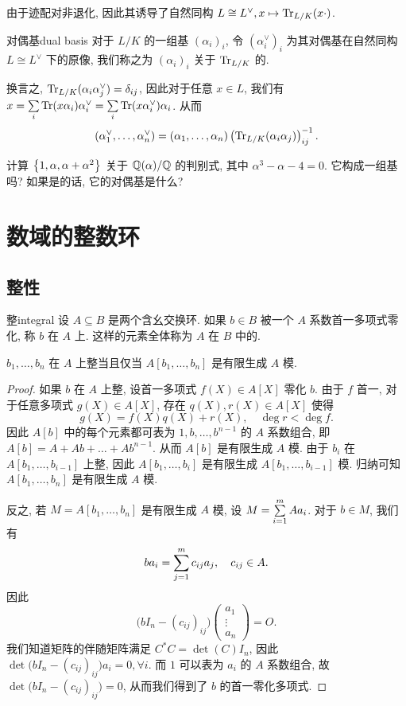 由于迹配对非退化, 因此其诱导了自然同构 $L\cong L^\vee, x\mapsto {\mathrm{Tr}}_{L/K}(x\cdot)$.
\begin{definition}{对偶基}{dual basis}
对于 $L/K$ 的一组基 $(\alpha_i)_i$, 令 $(\alpha_i^\vee)_i$ 为其对偶基在自然同构 $L\cong L^\vee$ 下的原像, 我们称之为 $(\alpha_i)_i$ 关于 ${\mathrm{Tr}}_{L/K}$ 的.
\end{definition}

换言之, ${\mathrm{Tr}}_{L/K}(\alpha_i\alpha_j^\vee)=\delta_{ij}$, 因此对于任意 $x\in L$, 我们有 $x=\sum\limits_i {\mathrm{Tr}}(x\alpha_i)\alpha_i^\vee=\sum\limits_i {\mathrm{Tr}}(x\alpha_i^\vee)\alpha_i$. 从而
  \[(\alpha_1^\vee,\dots,\alpha_n^\vee)=
    (\alpha_1,\dots,\alpha_n)\left({\mathrm{Tr}}_{L/K}(\alpha_i\alpha_j)\right)_{ij}^{-1}.\]

\begin{exercise}
计算 $\left\{1,\alpha,\alpha+\alpha^2\right\}$ 关于 ${\mathbb{Q}}(\alpha)/{\mathbb{Q}}$ 的判别式, 其中 $\alpha^3-\alpha-4=0$. 它构成一组基吗? 如果是的话, 它的对偶基是什么?
\end{exercise}



\section{数域的整数环}
\label{ring of intergers}

\subsection{整性}
\begin{definition}{整}{integral}
设 $A\subseteq B$ 是两个含幺交换环. 如果 $b\in B$ 被一个 $A$ 系数首一多项式零化, 称 $b$ 在 $A$ 上. 这样的元素全体称为 $A$ 在 $B$ 中的.
\end{definition}

\begin{proposition}{}{}
$b_1,\dots,b_n$ 在 $A$ 上整当且仅当 $A[b_1,\dots,b_n]$ 是有限生成 $A$ 模.
\end{proposition}
\begin{proof}
如果 $b$ 在 $A$ 上整, 设首一多项式 $f(X)\in A[X]$ 零化 $b$. 由于 $f$ 首一, 对于任意多项式 $g(X)\in A[X]$, 存在 $q(X),r(X)\in A[X]$ 使得
  \[g(X)=f(X)q(X)+r(X),\quad \deg r< \deg f.\]
因此 $A[b]$ 中的每个元素都可表为 $1,b,\dots,b^{n-1}$ 的 $A$ 系数组合, 即 $A[b]=A+Ab+\dots+Ab^{n-1}$. 从而 $A[b]$ 是有限生成 $A$ 模. 由于 $b_i$ 在 $A[b_1,\dots,b_{i-1}]$ 上整, 因此 $A[b_1,\dots,b_i]$ 是有限生成 $A[b_1,\dots,b_{i-1}]$ 模. 归纳可知 $A[b_1,\dots,b_n]$ 是有限生成 $A$ 模.

反之, 若 $M=A[b_1,\dots,b_n]$ 是有限生成 $A$ 模, 设 $M=\sum\limits_{i=1}^m A a_i$. 对于 $b\in M$, 我们有
  \[b a_i=\sum\limits_{j=1}^m c_{ij} a_j,\quad c_{ij}\in A.\]
因此 
	\[\bigl(bI_n-(c_{ij})_{ij}\bigr)\begin{pmatrix}
		a_1\\ \vdots \\ a_n 
	\end{pmatrix}=O.\]
我们知道矩阵的伴随矩阵满足 $C^*C=\det(C)I_n$, 因此 $\det\bigl(bI_n-(c_{ij})_{ij}\bigr)a_i=0,\forall i$. 而 $1$ 可以表为 $a_i$ 的 $A$ 系数组合, 故 $\det\bigl(bI_n-(c_{ij})_{ij}\bigr)=0$, 从而我们得到了 $b$ 的首一零化多项式.
\end{proof}

